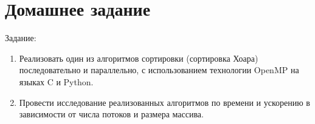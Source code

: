 \documentclass[a4paper,oneside,14pt]{extreport}
\begin{document}
\chapter*{Домашнее задание}

Задание:
\begin{enumerate}
	\item Реализовать один из алгоритмов сортировки (сортировка Хоара) последовательно и параллельно, с использованием технологии OpenMP на языках C и Python.
	\item Провести исследование реализованных алгоритмов по времени и ускорению в зависимости от числа потоков и размера массива.
\end{enumerate}
\end{document}
